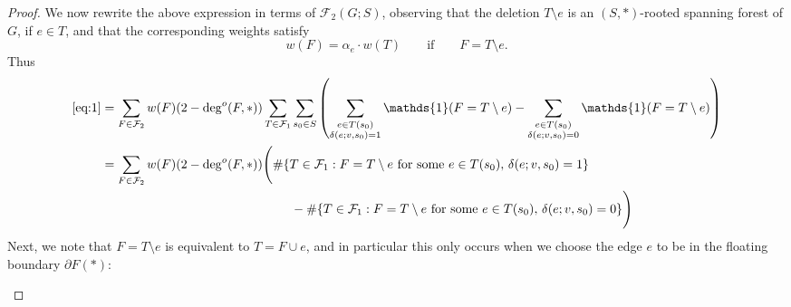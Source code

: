 \documentclass{amsart}
\theoremstyle{definition}
\newcommand{\one}{\mathds{1}}
\newcommand{\trees}{\mathcal{F}_1}
\newcommand{\forests}{\mathcal{F}}
\begin{document}
\begin{proof}
We now rewrite the above expression in terms of $\forests_2(G;S)$,
observing that the deletion $T \setminus e$ is an $(S,*)$-rooted spanning forest of $G$, if $e \in T$, and that the corresponding weights satisfy
\[
	w(F) = \alpha_e \cdot w(T) \qquad\text{if}\qquad F = T \setminus e.
\]
Thus
\begin{align*}
	\eqref{eq:1} &= \sum_{F \in \forests_2} w(F) (2 - \deg^o(F,*)) \sum_{T\in \trees} \sum_{s_0 \in S} \left( \sum_{\substack{e \in T(s_0) \\ \delta(e; v,s_0) = 1}} \one(F = T \setminus e) -  \sum_{\substack{e \in T(s_0) \\ \delta(e; v,s_0) = 0}} \one(F = T \setminus e) \right) \\
	&= \sum_{F \in \forests_2} w(F) (2 - \deg^o(F,*)) \Bigg( \#\{T \in \trees : F = T \setminus e \text{ for some } e \in T(s_0),\, \delta(e;v,s_0) = 1 \} \\
	&\qquad\qquad\qquad\qquad\qquad\qquad\qquad\quad - \#\{T \in \trees : F = T \setminus e \text{ for some } e \in T(s_0),\, \delta(e; v,s_0) = 0 \} \Bigg)
\end{align*}
Next, we note that $F = T \setminus e$ is equivalent to $T = F \cup e$, and in particular this only occurs when we choose the edge $e$ to be in the floating boundary $\partial F(*)$:

\begin{figure}[h]
\qquad\qquad
\end{figure}
\end{proof}
\end{document}
